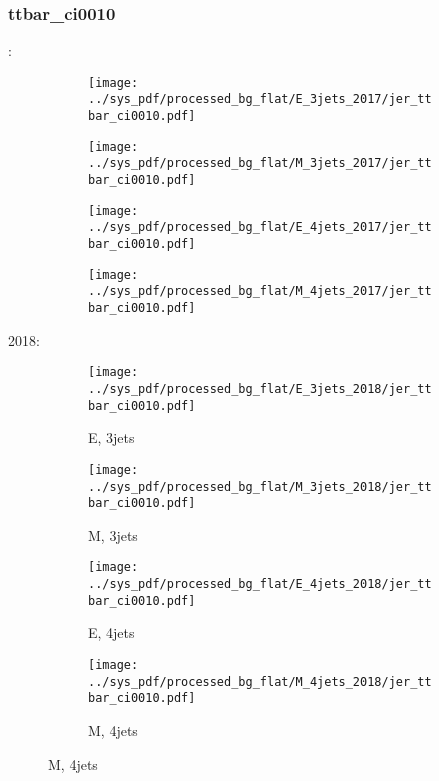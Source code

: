 \documentclass{beamer}
\begin{document}
\begin{frame}
\frametitle{ttbar_ci0010}
\fontsize{5}{1}:
\begin{figure}
\centering
\begin{subfigure}[b]{0.24\textwidth}
\texttt{[image: ../sys\_pdf/processed\_bg\_flat/E\_3jets\_2017/jer\_ttbar\_ci0010.pdf]}
\end{subfigure}
\begin{subfigure}[b]{0.24\textwidth}
\texttt{[image: ../sys\_pdf/processed\_bg\_flat/M\_3jets\_2017/jer\_ttbar\_ci0010.pdf]}
\end{subfigure}
\begin{subfigure}[b]{0.24\textwidth}
\texttt{[image: ../sys\_pdf/processed\_bg\_flat/E\_4jets\_2017/jer\_ttbar\_ci0010.pdf]}
\end{subfigure}
\begin{subfigure}[b]{0.24\textwidth}
\texttt{[image: ../sys\_pdf/processed\_bg\_flat/M\_4jets\_2017/jer\_ttbar\_ci0010.pdf]}
\end{subfigure}
\end{figure}
2018:
\begin{figure}
\centering
\begin{subfigure}[b]{0.24\textwidth}
\texttt{[image: ../sys\_pdf/processed\_bg\_flat/E\_3jets\_2018/jer\_ttbar\_ci0010.pdf]}
\captionsetup{font=tiny}
\caption{E, 3jets}
\end{subfigure}
\begin{subfigure}[b]{0.24\textwidth}
\texttt{[image: ../sys\_pdf/processed\_bg\_flat/M\_3jets\_2018/jer\_ttbar\_ci0010.pdf]}
\captionsetup{font=tiny}
\caption{M, 3jets}
\end{subfigure}
\begin{subfigure}[b]{0.24\textwidth}
\texttt{[image: ../sys\_pdf/processed\_bg\_flat/E\_4jets\_2018/jer\_ttbar\_ci0010.pdf]}
\captionsetup{font=tiny}
\caption{E, 4jets}
\end{subfigure}
\begin{subfigure}[b]{0.24\textwidth}
\texttt{[image: ../sys\_pdf/processed\_bg\_flat/M\_4jets\_2018/jer\_ttbar\_ci0010.pdf]}
\captionsetup{font=tiny}
\caption{M, 4jets}
\end{subfigure}
\end{figure}
\end{frame}
\end{document}
